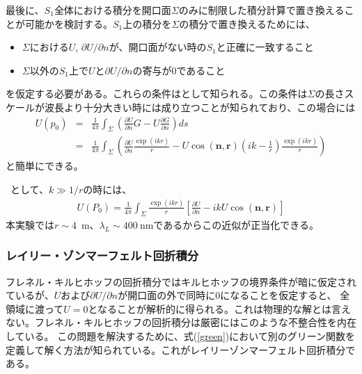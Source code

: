 \documentclass[a4paper,11pt,uplatex]{jsbook}
\begin{document}
最後に、$S_1$全体における積分を開口面$\Sigma$のみに制限した積分計算で置き換えることが可能かを検討する。$S_1$上の積分を$\Sigma$の積分で置き換えるためには、
\begin{itemize}
  \item $\Sigma$における$U$, $\partial U/\partial n$が、開口面がない時の$S_1$と正確に一致すること
  \item $\Sigma$以外の$S_1$上で$U$と$\partial U/\partial n$の寄与が0であること
\end{itemize}
を仮定する必要がある。これらの条件はとして知られる。この条件は$\Sigma$の長さスケールが波長より十分大きい時には成り立つことが知られており、この場合には
\begin{eqnarray}
  U(p_0) &=& \frac{1}{4\pi}\int_\Sigma \left( \frac{\partial U}{\partial n}G - U \frac{\partial G}{\partial n}\right)ds \\
  &=& \frac{1}{4\pi} \int_\Sigma \left( \frac{\partial U}{\partial n}\frac{\exp(ikr)}{r} - U \cos(\bm{n},\bm{r})\left(ik - \frac{1}{r}\right)\frac{\exp(ikr)}{r}\right)
\end{eqnarray}
と簡単にできる。

~として、$k \gg 1/r$の時には、
\begin{eqnarray}
  U(P_0) = \frac{1}{4\pi}\int_\Sigma \frac{\exp(ikr)}{r}\left[\frac{\partial U}{\partial n} - ik U \cos(\bm{n},\bm{r})\right]
\end{eqnarray}
本実験では$r\sim 4$~m、$\lambda_L \sim 400~$nmであるからこの近似が正当化できる。

\subsubsection{レイリー・ゾンマーフェルト回折積分}
フレネル・キルヒホッフの回折積分ではキルヒホッフの境界条件が暗に仮定されているが、$U$および$\partial U/\partial n$が開口面の外で同時に0になることを仮定すると、
全領域に渡って$U=0$となることが解析的に得られる。これは物理的な解とは言えない。フレネル・キルヒホッフの回折積分は厳密にはこのような不整合性を内在している。
この問題を解決するために、式(\ref{green})において別のグリーン関数を定義して解く方法が知られている。これがレイリーゾンマーフェルト回折積分である。
\end{document}
